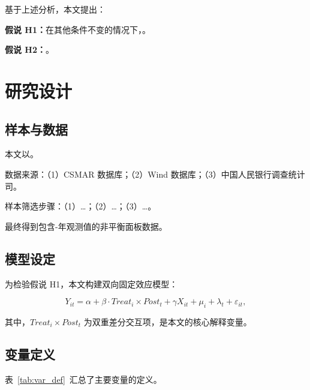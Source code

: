 \documentclass[lang=cn, aaffiliation={中国}]{ctexart}
\begin{document}
基于上述分析，本文提出：

\textbf{假说 H1：}在其他条件不变的情况下，。

\textbf{假说 H2：}。

\section{研究设计}
\label{sec:design}

\subsection{样本与数据}
\label{sec:data}

本文以。

数据来源：（1）CSMAR 数据库；（2）Wind 数据库；（3）中国人民银行调查统计司。

样本筛选步骤：（1）\dots；（2）\dots；（3）\dots。

最终得到包含-\/年观测值的非平衡面板数据。

\subsection{模型设定}
\label{sec:model}

为检验假说 H1，本文构建双向固定效应模型：

\begin{equation}
    \label{eq:main}
    Y_{it} = \alpha + \beta \cdot Treat_i \times Post_t + \gamma X_{it} + \mu_i + \lambda_t + \varepsilon_{it},
\end{equation}

其中，$Treat_i \times Post_t$ 为双重差分交互项，是本文的核心解释变量。

\subsection{变量定义}
\label{sec:var}

表~\ref{tab:var_def}~汇总了主要变量的定义。
\end{document}

